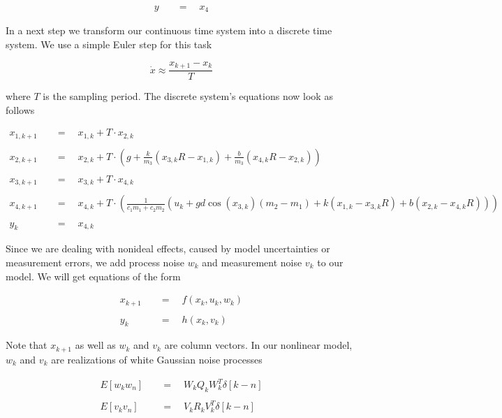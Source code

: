 \documentclass{article}
\begin{document}
\[
\begin{aligned}
y\quad &=\quad x_4
\end{aligned}
\]

In a next step we transform our continuous time system into a discrete time system. We use a simple Euler step for this task

\[\dot{x} \approx \frac{x_{k+1} - x_k}{T}\]

where \(T\) is the sampling period. The discrete system's equations now look as follows

\[
\begin{aligned}
x_{1,k+1}\quad &=\quad x_{1,k} + T\cdot  x_{2,k} \\\\
x_{2,k+1}\quad &=\quad x_{2,k} + T\cdot \left( g + \frac{k}{m_3} (x_{3,k} R - x_{1,k}) + \frac{b}{m_3} (x_{4,k} R - x_{2,k}) \right) \\\\
x_{3,k+1}\quad &=\quad x_{3,k} + T\cdot x_{4,k} \\\\
x_{4,k+1}\quad &=\quad x_{4,k} + T\cdot \left( \frac{1}{c_1 m_1 + c_2 m_2} \left( u_k + gd\cos(x_{3,k})(m_2 - m_1) + k(x_{1,k} - x_{3,k} R) + b(x_{2,k} - x_{4,k}R) \right) \right) \\\\
y_k\quad &=\quad x_{4,k}
\end{aligned}
\]

Since we are dealing with nonideal effects, caused by model uncertainties or measurement errors, we add process noise \(w_k\) and measurement noise \(v_k\) to our model. We will get equations of the form

\[
\begin{aligned}
x_{k+1}\quad &=\quad f(x_k,u_k,w_k) \\\\
y_k \quad&=\quad h(x_k,v_k)
\end{aligned}
\]

Note that \(x_{k+1}\) as well as \(w_k\) and \(v_k\) are column vectors. In our nonlinear model, \(w_k\) and \(v_k\) are realizations of white Gaussian noise processes

\[
\begin{aligned}
E[w_k w_n]\quad &=\quad W_kQ_kW_k^T \delta[k-n] \\\\
E[v_k v_n]\quad &=\quad V_kR_kV_k^T \delta[k-n] \\\\
\end{aligned}
\]
\end{document}
